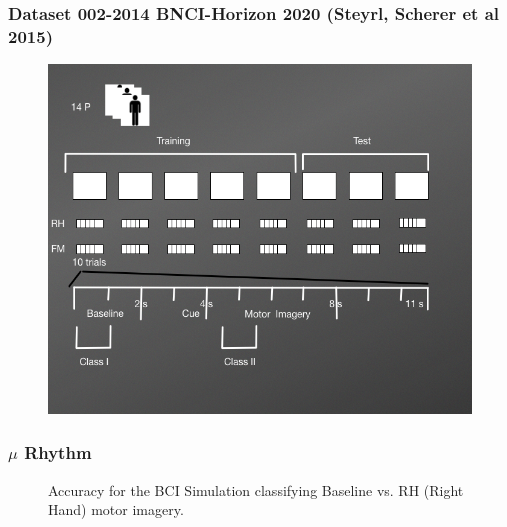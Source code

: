 \documentclass[aspectratio=169]{beamer}
\begin{document}
\begin{frame}
\frametitle{Dataset 002-2014 BNCI-Horizon 2020 (Steyrl, Scherer et al 2015)}
\begin{figure}[thpb]
\centering
\setlength\fboxsep{0pt}
\setlength\fboxrule{0.5pt}
\includegraphics[scale=0.34]{images/DatasetIIIDiagram2}    
\end{figure} 	
\end{frame}	

   \begin{frame}   
   \frametitle{$\mu$ Rhythm}
   \begin{figure}[thpb]
      \centering
      \setlength\fboxsep{0pt}
	  \setlength\fboxrule{0.5pt}
      \caption{\centering Accuracy for the BCI Simulation classifying Baseline vs. RH (Right Hand) motor imagery.}
      \label{figure3}
   \end{figure} 	
	\end{frame}	  
	
\end{document}
